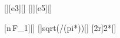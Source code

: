 [\kilo\newton][e3][\newton]
[\bar][e5][\pascal]

[n\,F_1]{\nPfX*\FPfX}[\newton]
[]{sqrt(\nPfX*\FPfX/(pi*\pnmX))}[\meter]
[2r]{2*\rmhX}[\meter]
